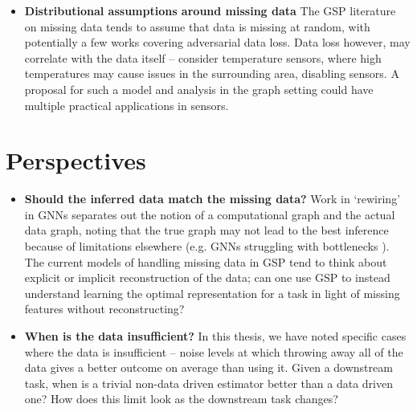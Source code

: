 \begin{itemize}
    \item \textbf{Distributional assumptions around missing data} The GSP literature on missing data tends to assume that data is missing at random, with potentially a few works covering adversarial data loss. Data loss however, may correlate with the data itself -- consider temperature sensors, where high temperatures may cause issues in the surrounding area, disabling sensors. A proposal for such a model and analysis in the graph setting could have multiple practical applications in sensors.
\end{itemize}


\section{Perspectives}
\begin{itemize}
    \item \textbf{Should the inferred data match the missing data?} Work in `rewiring' in GNNs separates out the notion of a computational graph and the actual data graph, noting that the true graph may not lead to the best inference because of limitations elsewhere (e.g. GNNs struggling with bottlenecks \cite{barbero2024localityaware}). The current models of handling missing data in GSP tend to think about explicit or implicit reconstruction of the data; can one use GSP to instead understand learning the optimal representation for a task in light of missing features without reconstructing? 
    \item \textbf{When is the data insufficient?} In this thesis, we have noted specific cases where the data is insufficient -- noise levels at which throwing away all of the data gives a better outcome on average than using it. Given a downstream task, when is a trivial non-data driven estimator better than a data driven one? How does this limit look as the downstream task changes?

\end{itemize}
